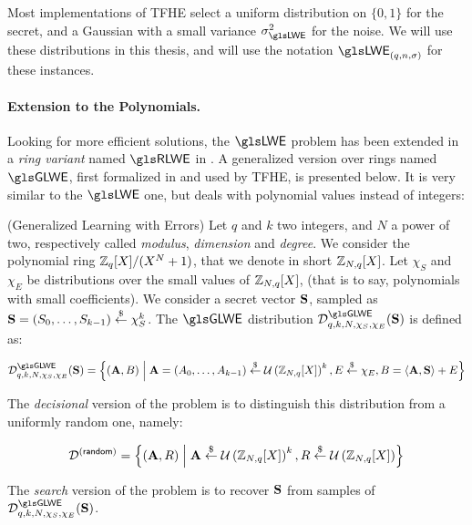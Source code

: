 Most implementations of \gls{TFHE} select a uniform distribution on $\{0, 1\}$ for the secret, and a Gaussian with a small variance $\lweSigma^2$ for the noise. We will use these distributions in this thesis, and will use the notation $\LWE_{(q, n, \sigma)}$ for these instances.



\paragraph{Extension to the Polynomials.}


Looking for more efficient solutions, the $\LWE$ problem has been extended in a \textit{ring variant} named $\RLWE$ in \cite{EC:LyuPeiReg10, AC:SSTX09}. A generalized version over rings named $\GLWE$, first formalized in \cite{EPRINT:BraGenVai11} and used by \gls{TFHE}, is presented below. It is very similar to the $\LWE$ one, but deals with polynomial values instead of integers:

\begin{definition}
	(Generalized Learning with Errors) Let $q$ and $k$ two integers, and $N$ a power of two, respectively called \textit{modulus}, \textit{dimension} and \textit{degree}. We consider the polynomial ring $\mathbb{Z}_q[X] / (X^N + 1)$, that we denote in short $\mathbb{Z}_{N,q}[X]$. Let $\chi_S$ and $\chi_E$ be distributions over the small values of $\mathbb{Z}_{N,q}[X]$, (that is to say, polynomials with small coefficients). We consider a secret vector $\mathbf S$, sampled as $\mathbf S = (S_0, \dots, S_{k-1}) \overset{\$}{\leftarrow} \chi_S^k$. The $\GLWE$ distribution $\mathcal{D}_{q, k, N, \chi_S, \chi_E}^{\GLWE}(\glweSecretKey)$ is defined as:
	
	\[
	\mathcal{D}_{q, k, N, \chi_S, \chi_E}^{\GLWE}(\glweSecretKey) = \left \{ (\vec A, B) \;\middle|\; \vec A = (A_0, \dots, A_{k-1}) \drawfrom \unif{\glweRing}^k, E \drawfrom \chi_E, B = \innerProduct{\vec A}{\vec S} + E \right \}
	\]
	
	The \textit{decisional} version of the problem is to distinguish this distribution from a uniformly random one, namely:
	
	\[
	\mathcal{D}^{(\textsf{random})} = \left \{(\mathbf A, R) \;\middle|\; \mathbf A \overset{\$}{\leftarrow} \mathcal U \left ( \mathbb{Z}_{N,q}[X] \right )^k, R \overset{\$}{\leftarrow} \mathcal U \left ( \mathbb{Z}_{N,q}[X] \right ) \right\}
	\]
	
	The \emph{search} version of the problem is to recover $\mathbf S$ from samples of $\mathcal{D}_{q, k , N, \chi_S, \chi_E}^{\GLWE}(\glweSecretKey)$. 
	\label{def:GLWE}
\end{definition}

